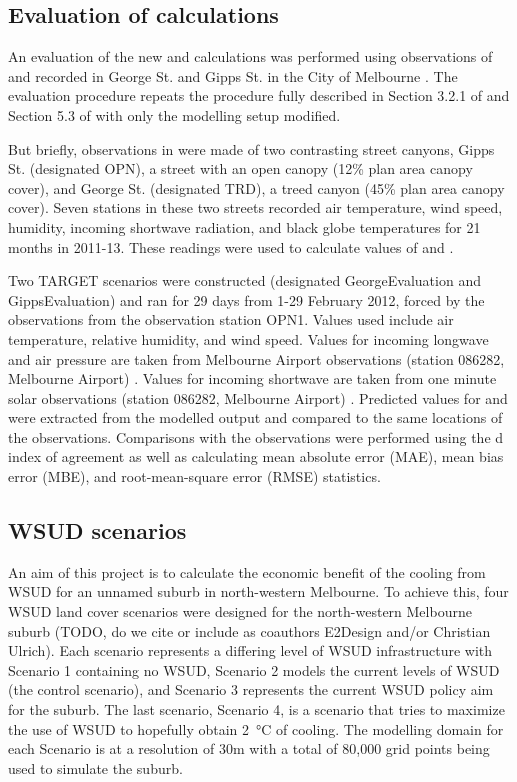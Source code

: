 \documentclass[final,3p,times,authoryear]{elsarticle}
\begin{document}
\subsection{Evaluation of  calculations}\label{sec:methods_eval}

An evaluation of the new  and  calculations was performed using observations of  and  recorded in George St. and Gipps St. in the City of Melbourne \citep{Coutts2015}. The evaluation procedure repeats the procedure fully described in Section 3.2.1 of \cite{Nice2018} and Section 5.3 of \cite{Nice2016} with only the modelling setup modified. 

But briefly, observations in \cite{Coutts2015} were made of two contrasting street canyons, Gipps St. (designated OPN), a street with an open canopy (12\% plan area canopy cover), and George St. (designated TRD), a treed canyon (45\% plan area canopy cover). Seven stations in these two streets recorded air temperature, wind speed, humidity, incoming shortwave radiation, and black globe temperatures for 21 months in 2011-13. These readings were used to calculate values of  and . 


Two TARGET scenarios were constructed (designated GeorgeEvaluation and GippsEvaluation) and ran for 29 days from 1-29 February 2012, forced by the observations from the observation station OPN1. Values used include air temperature, relative humidity, and wind speed. Values for incoming longwave and air pressure are taken from Melbourne Airport observations (station 086282, Melbourne Airport) \citep{BOM2016b}. Values for incoming shortwave are taken from one minute solar observations (station 086282, Melbourne Airport) \citep{BOM2016}. Predicted values for  and  were extracted from the modelled output and compared to the same locations of the observations. Comparisons with the observations were performed using the \cite{Willmott1981} d index of agreement as well as calculating mean absolute error (MAE), mean bias error (MBE), and root-mean-square error (RMSE) statistics.




\subsection{WSUD scenarios}\label{sec:methods_wsudscenarios}
An aim of this project is to calculate the economic benefit of the cooling from WSUD for an unnamed suburb in north-western Melbourne. To achieve this, four WSUD land cover scenarios were designed for the north-western Melbourne suburb (TODO, do we cite or include as coauthors E2Design and/or Christian Ulrich). Each scenario represents a differing level of WSUD infrastructure with Scenario 1 containing no WSUD, Scenario 2 models the current levels of WSUD (the control scenario), and Scenario 3 represents the current WSUD policy aim for the suburb. The last scenario, Scenario 4, is a scenario that tries to maximize the use of WSUD to hopefully obtain 2\SI{}{\degreeCelsius} of cooling. The modelling domain for each Scenario is at a resolution of 30m with a total of 80,000 grid points being used to simulate the suburb.
\end{document}
